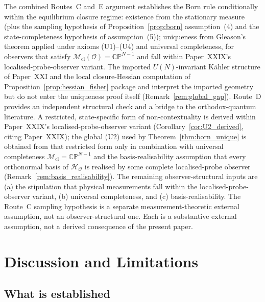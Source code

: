 \documentclass[12pt]{article}
\newcommand{\Ocal}{\mathcal{O}}
\newcommand{\Hcal}{\mathcal{H}}
\newcommand{\Mcl}{\mathcal{M}_{\mathrm{cl}}}
\begin{document}
The combined Routes~C and~E argument establishes the Born rule conditionally within the equilibrium closure regime: existence from the stationary measure (plus the sampling hypothesis of Proposition~\ref{prop:born} assumption~(4) and the state-completeness hypothesis of assumption~(5)); uniqueness from Gleason's theorem applied under axioms (U1)--(U4) and universal completeness, for observers that satisfy $\Mcl(\Ocal) = \mathbb{CP}^{N-1}$ and fall within Paper~XXIX's localised-probe-observer variant. The imported $U(N)$-invariant K\"ahler structure of Paper~XXI and the local closure-Hessian computation of Proposition~\ref{prop:hessian_fisher} package and interpret the imported geometry but do not enter the uniqueness proof itself (Remark~\ref{rem:global_gap}). Route~D provides an independent structural check and a bridge to the orthodox-quantum literature. A restricted, state-specific form of non-contextuality is derived within Paper~XXIX's localised-probe-observer variant (Corollary~\ref{cor:U2_derived}, citing Paper~XXIX); the global (U2) used by Theorem~\ref{thm:born_unique} is obtained from that restricted form only in combination with universal completeness $\Mcl = \mathbb{CP}^{N-1}$ and the basis-realisability assumption that every orthonormal basis of $\Hcal_\Ocal$ is realised by some complete localised-probe observer (Remark~\ref{rem:basis_realisability}). The remaining observer-structural inputs are (a) the stipulation that physical measurements fall within the localised-probe-observer variant, (b) universal completeness, and (c) basis-realisability. The Route~C sampling hypothesis is a separate measurement-theoretic external assumption, not an observer-structural one. Each is a substantive external assumption, not a derived consequence of the present paper.

\section{Discussion and Limitations}\label{sec:discussion}

\subsection{What is established}
\end{document}
